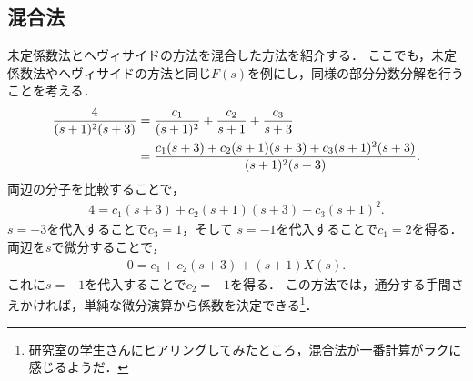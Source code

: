 %
\subsection{混合法}
%
未定係数法とヘヴィサイドの方法を混合した方法を紹介する．
ここでも，未定係数法やヘヴィサイドの方法と同じ$F(s)$を例にし，同様の部分分数分解を行うことを考える．
%
\begin{align}
 \dfrac{4}{(s+1)^2(s+3)} &=  \dfrac{c_1}{(s+1)^2} + \dfrac{c_2}{s+1} + \dfrac{c_3}{s+3} \notag \\
                         &=  \dfrac{c_1(s+3)+c_2(s+1)(s+3)+c_3(s+1)^2(s+3)}{(s+1)^2(s+3)}.
\end{align}
%
両辺の分子を比較することで，
\begin{align}
 4 = c_1(s+3) + c_2(s+1)(s+3) + c_3(s+1)^2. 
\end{align}
$s=-3$を代入することで$c_3 = 1$，そして
$s=-1$を代入することで$c_1 = 2$を得る．
両辺を$s$で微分することで，
\begin{align}
 0 = c_1 + c_2(s+3) + (s+1)X(s).
\end{align}
これに$s=-1$を代入することで$c_2 = -1$を得る．
この方法では，通分する手間さえかければ，単純な微分演算から係数を決定できる\footnote{研究室の学生さんにヒアリングしてみたところ，混合法が一番計算がラクに感じるようだ．}．
%
\newpage
%
